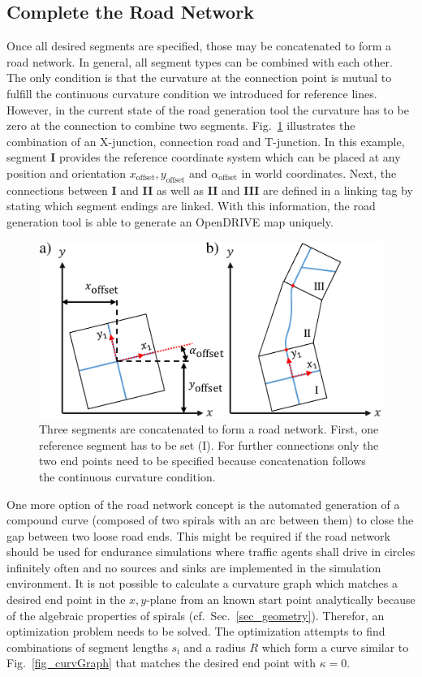 \documentclass[a4paper, 10pt, conference]{ieeeconf}      %
\begin{document}
\subsection{Complete the Road Network}
Once all desired segments are specified, those may be concatenated to form a road network. In general, all segment types can be combined with each other. The only condition is that the curvature at the connection point is mutual to fulfill the continuous curvature condition we introduced for reference lines. However, in the current state of the road generation tool the curvature has to be zero at the connection to combine two segments. Fig.~\ref{fig_concatSeg} illustrates the combination of an X-junction, connection road and T-junction. In this example, segment \textbf{I} provides the reference coordinate system which can be placed at any position and orientation $x_\text{offset}, y_\text{offset}$ and $\alpha_\text{offset}$ in world coordinates. Next, the connections between \textbf{I} and \textbf{II} as well as \textbf{II} and \textbf{III} are defined in a linking tag by stating which segment endings are linked. With this information, the road generation tool is able to generate an OpenDRIVE map uniquely.
\begin{figure}[thpb] 		
	\centering
	\includegraphics{fig/concatSegments.pdf}
	\caption{Three segments are concatenated to form a road network. First, one reference segment has to be set (I). For further connections only the two end points need to be specified because concatenation follows the continuous curvature condition.}
	\label{fig_concatSeg}
\end{figure}

One more option of the road network concept is the automated generation of a compound curve (composed of two spirals with an arc between them) to close the gap between two loose road ends. This might be required if the road network should be used for endurance simulations where traffic agents shall drive in circles infinitely often and no sources and sinks are implemented in the simulation environment. It is not possible to calculate a curvature graph which matches a desired end point in the $x,y$-plane from an known start point analytically because of the algebraic properties of spirals (cf.~Sec.~\ref{sec_geometry}). Therefor, an optimization problem needs to be solved. The optimization attempts to find combinations of segment lengths $s_\text{i}$ and a radius $R$ which form a curve similar to Fig.~\ref{fig_curvGraph} that matches the desired end point with $\kappa=0$.
\end{document}
